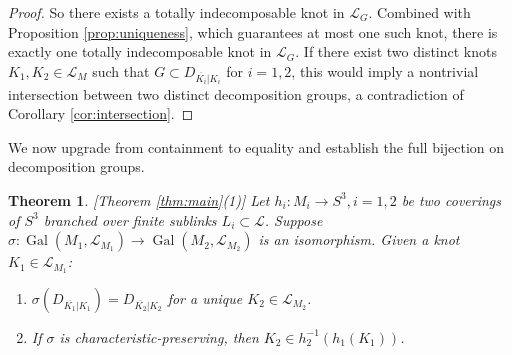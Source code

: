 \documentclass{amsart}
\theoremstyle{plain}
\newtheorem{theorem}{Theorem}[section]
\theoremstyle{definition}
\theoremstyle{plain}
\theoremstyle{plain}
\theoremstyle{plain}
\theoremstyle{remark}
\theoremstyle{remark}
\theoremstyle{plain}
\theoremstyle{definition}
\theoremstyle{plain}
\DeclareMathOperator{\Gal}{\mathrm{Gal}}
\newcounter{main}
\theoremstyle{plain}
\theoremstyle{plain}
\numberwithin{equation}{section}
\begin{document}
\begin{proof}
So there exists a totally indecomposable knot in $\mathcal{L}_G$. Combined with Proposition \ref{prop:uniqueness}, which guarantees at most one such knot, there is exactly one totally indecomposable knot in $\mathcal{L}_G$. If there exist two distinct knots $K_1, K_2 \in \mathcal{L}_M$ such that $G \subset D_{\overline{K_i}|K_i}$ for $i = 1, 2$, this would imply a nontrivial intersection between two distinct decomposition groups, a contradiction of Corollary \ref{cor:intersection}.
\end{proof}


We now upgrade from containment to equality and establish the full bijection on decomposition groups.

\begin{theorem}\label{thm:second}[Theorem \ref{thm:main}(1)]
Let $h_i: M_i \to S^3, i = 1, 2$ be two coverings of $S^3$ branched over finite sublinks $L_i \subset \mathcal{L}$. Suppose $\sigma: \Gal(M_1, \mathcal{L}_{M_1}) \to \Gal(M_2, \mathcal{L}_{M_2})$ is an isomorphism. Given a knot $K_1 \in \mathcal{L}_{M_1}$: 
\begin{enumerate}
    \item $\sigma(D_{\overline{K_1}|K_1}) = D_{\overline{K_2}|K_2}$ for a unique $K_2 \in \mathcal{L}_{M_2}$.
    \item If $\sigma$ is characteristic-preserving, then $K_2 \in h_2^{-1}(h_1(K_1))$.
\end{enumerate}
\end{theorem}
\end{document}
